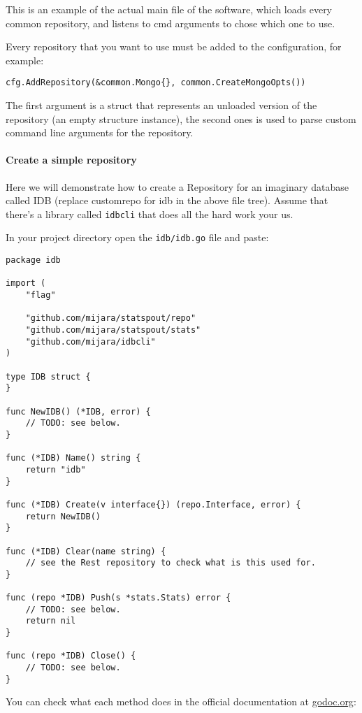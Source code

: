 This is an example of the actual main file of the software, which loads every common repository, and listens to cmd arguments to chose which one to use.

Every repository that you want to use must be added to the configuration, for example:

\begin{lstlisting}[language=Golang]
cfg.AddRepository(&common.Mongo{}, common.CreateMongoOpts())
\end{lstlisting}

The first argument is a struct that represents an unloaded version of the repository (an empty structure instance), the second ones is used to parse custom command line arguments for the repository.

\paragraph{Create a simple repository}

Here we will demonstrate how to create a Repository for an imaginary database called IDB (replace customrepo for idb in the above file tree). Assume that there's a library called \texttt{idbcli} that does all the hard work your us.

In your project directory open the \texttt{idb/idb.go} file and paste:

\begin{lstlisting}[language=Golang]
package idb

import (
    "flag"

    "github.com/mijara/statspout/repo"
    "github.com/mijara/statspout/stats"
    "github.com/mijara/idbcli"
)

type IDB struct {
}

func NewIDB() (*IDB, error) {
	// TODO: see below.
}

func (*IDB) Name() string {
	return "idb"
}

func (*IDB) Create(v interface{}) (repo.Interface, error) {
	return NewIDB()
}

func (*IDB) Clear(name string) {
    // see the Rest repository to check what is this used for.
}

func (repo *IDB) Push(s *stats.Stats) error {
    // TODO: see below.
	return nil
}

func (repo *IDB) Close() {
    // TODO: see below.
}
\end{lstlisting}

You can check what each method does in the official documentation at \url{godoc.org}:

